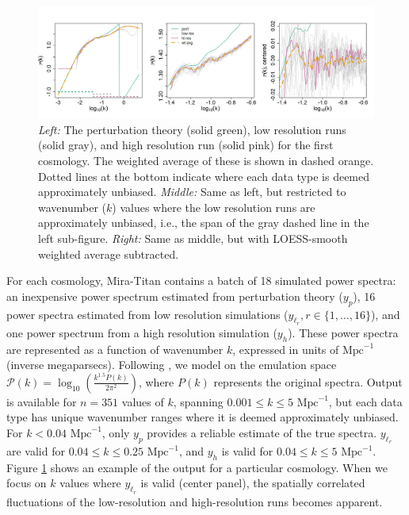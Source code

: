 \documentclass[11pt]{article}
\begin{document}
\begin{figure}[ht]
    \centering 
    \includegraphics[width=\linewidth]{plot_data.jpeg}
    \caption{{\it Left:} The perturbation theory (solid green), low resolution runs (solid gray), 
    and high resolution run  (solid pink) for the first cosmology. 
    The weighted average of these is shown in dashed orange. Dotted lines at the bottom
    indicate where each data type is deemed approximately unbiased. 
    {\it Middle:} Same as left, but restricted to wavenumber ($k$) values where the low resolution 
    runs are approximately unbiased, i.e., the span of the gray dashed line in the left sub-figure.
    {\it Right:} Same as middle, but with LOESS-smooth weighted average subtracted.}
    \label{fig:plot_data}
\end{figure}

For each cosmology, Mira-Titan contains a batch of 18 simulated power spectra: an inexpensive 
power spectrum estimated from perturbation theory ($y_p$), 16 power spectra estimated from 
low resolution simulations ($y_{\ell_r}, r \in \{1,\dots,16\}$), and one power spectrum from 
a high resolution simulation ($y_h$). 
These power spectra are represented as a function of wavenumber $k$, expressed in units of 
$\text{Mpc}^{-1}$ (inverse megaparsecs).  Following 
\cite{moran2023mira}, we model on the emulation space 
$\mathcal{P}(k)=\log_{10}\left(\frac{k^{1.5}P(k)}{2\pi^2}\right)$, where $P(k)$ represents the
original spectra. Output is available for $n=351$ values of $k$, spanning
$0.001 \leq k \leq 5 \text{ Mpc}^{-1}$, but each data type has unique wavenumber ranges
where it is deemed approximately unbiased. For $k<0.04 \text{ Mpc}^{-1}$, only $y_p$ provides a reliable 
estimate of the true spectra. $y_{\ell_r}$ are valid for $0.04 \leq k \leq 0.25 \text{ Mpc}^{-1}$, and 
$y_h$ is valid for $0.04 \leq k \leq 5 \text{ Mpc}^{-1}$.  Figure \ref{fig:plot_data} shows an example 
of the output for a particular cosmology. When we focus on $k$ values where $y_{\ell_r}$ 
is valid (center panel), the spatially correlated fluctuations of the low-resolution and 
high-resolution runs becomes apparent.
\end{document}
